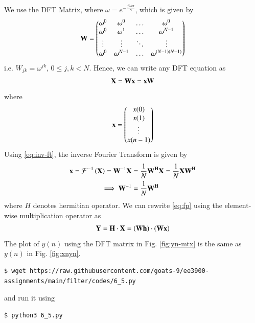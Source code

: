 \documentclass[journal,12pt,twocolumn]{IEEEtran}
\renewcommand\thesection{\arabic{section}}
\begin{document}
\begin{enumerate}[label=\thesection.\arabic*]
\solution
We use the DFT Matrix, where $\omega = e^{-\frac{j2k\pi}{N}}$, which is given by
\begin{align}
	\mathbf{W} = 
	\begin{pmatrix}
		\omega^0 & \omega^0 & \ldots & \omega^0 \\
		\omega^0 & \omega^1 & \ldots & \omega^{N - 1} \\
		\vdots & \vdots & \ddots & \vdots \\
		\omega^0 & \omega^{N - 1} & \ldots & \omega^{(N -1)(N - 1)}
	\end{pmatrix}
\end{align}
i.e. $W_{jk} = \omega^{jk}$, $0 \leq j, k < N$. Hence, we can write any DFT equation as
\begin{align}
	\mathbf{X} = \mathbf{W}\mathbf{x} = \mathbf{x}\mathbf{W}
\end{align}
\noindent where
\begin{align}
	\mathbf{x} = 
	\begin{pmatrix}
		x(0) \\ x(1) \\ \vdots \\ x(n - 1)
	\end{pmatrix}
\end{align}
\noindent Using \eqref{eq:inv-ft}, the inverse Fourier Transform is given by
\begin{align}
	\mathbf{x} = \mathcal{F}^{-1}\left(\mathbf{X}\right) = \mathbf{W}^{-1}\mathbf{X} &= 
	\frac{1}{N}\mathbf{W^{H}}\mathbf{X} = \frac{1}{N}\mathbf{X}\mathbf{W^{H}} \\ 
	\implies \mathbf{W}^{-1} &= \frac{1}{N}\mathbf{W^{H}}
\end{align}
\noindent where $H$ denotes hermitian operator. We can rewrite \eqref{eq:fp} using the
element-wise multiplication operator as
\begin{align}
	\mathbf{Y} = \mathbf{H}\cdot\mathbf{X} = \left(\mathbf{W}\mathbf{h}\right)\cdot\left(\mathbf{W}\mathbf{x}\right)
\end{align}
The plot of $y(n)$ using the DFT matrix in Fig. \eqref{fig:yn-mtx} is the same as $y(n)$ in 
Fig. \eqref{fig:xnyn}.
\begin{lstlisting}
$ wget https://raw.githubusercontent.com/goats-9/ee3900-assignments/main/filter/codes/6_5.py
\end{lstlisting}
and run it using
\begin{lstlisting}
$ python3 6_5.py 
\end{lstlisting}


\end{enumerate}
\end{document}
